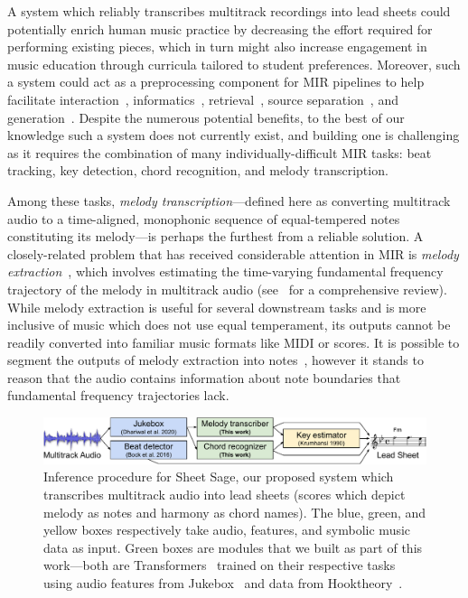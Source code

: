 \documentclass{article}
\begin{document}
A system which reliably transcribes multitrack recordings into lead sheets could potentially enrich human music practice by
decreasing the effort required for performing existing pieces, 
which in turn might also increase engagement in music education through curricula tailored to student preferences. 
Moreover, such a system could act as a preprocessing component for MIR pipelines to help facilitate 
interaction~\cite{jenson2016so}, 
informatics~\cite{bainbridge1999towards}, 
retrieval~\cite{ghias1995query}, 
source separation~\cite{ewert2014score}, 
and generation~\cite{hawthorne2019enabling}. 
Despite the numerous potential benefits, 
to the best of our knowledge such a system does not currently exist, 
and building one is challenging as it requires the combination of many individually-difficult MIR tasks: 
beat tracking, 
key detection, 
chord recognition, 
and melody transcription.

Among these tasks, 
\emph{melody transcription}---defined here as converting multitrack audio to a time-aligned, monophonic sequence of equal-tempered notes constituting its melody---is perhaps the furthest from a reliable solution. 
A closely-related problem that has received considerable attention in MIR is \emph{melody extraction}~\cite{goto2000robust}, 
which involves estimating the time-varying fundamental frequency trajectory of the melody in multitrack audio (see~\cite{salamon2014melody} for a comprehensive review). 
While melody extraction is useful for several downstream tasks and is more inclusive of music which does not use equal temperament, 
its outputs cannot be readily converted into familiar music formats like MIDI or scores. 
It is possible to segment the outputs of melody extraction into notes~\cite{nishikimi2016musical}, 
however it stands to reason that the audio contains information about note boundaries that fundamental frequency trajectories lack.

\begin{figure}
    \centering
    \includegraphics[width=\linewidth]{figs/one.pdf}
    \caption{Inference procedure for Sheet Sage, our proposed system which transcribes multitrack audio into lead sheets (scores which depict melody as notes and harmony as chord names). The blue, green, and yellow boxes respectively take audio, features, and symbolic music data as input. Green boxes are modules that we built as part of this work---both are Transformers~\cite{vaswani2017attention} trained on their respective tasks using audio features from Jukebox~\cite{dhariwal2020jukebox} and data from Hooktheory~\cite{hooktheory}.}
    \label{fig:one}
\end{figure}
\end{document}
